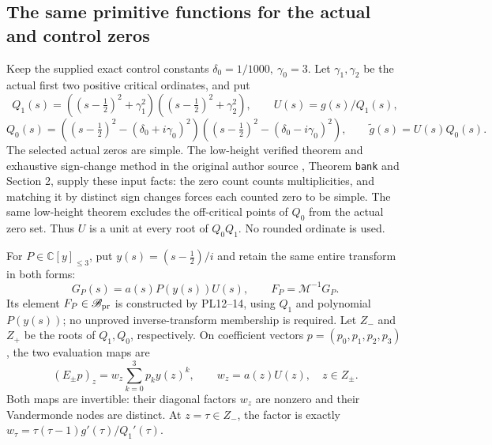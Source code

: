 \documentclass[11pt,a4paper]{article}
\theoremstyle{definition}\newtheorem{definition}[theorem]{Definition}
\newcommand{\C}{\mathbb C}\newcommand{\R}{\mathbb R}
\begin{document}
\subsection{The same primitive functions for the actual and control zeros}
Keep the supplied exact control constants
\(\delta_0=1/1000,\ \gamma_0=3\). Let \(\gamma_1,\gamma_2\)
be the actual first two positive critical ordinates, and put
\[
 Q_1(s)=((s-\tfrac12)^2+\gamma_1^2)
        ((s-\tfrac12)^2+\gamma_2^2),\qquad U(s)=g(s)/Q_1(s),
\]
\[
 Q_0(s)=((s-\tfrac12)^2-(\delta_0+i\gamma_0)^2)
        ((s-\tfrac12)^2-(\delta_0-i\gamma_0)^2),\qquad
 \widetilde g(s)=U(s)Q_0(s).
 \tag{PL29}\label{pl:pl:control}
\]
The selected actual zeros are simple. The low-height verified theorem
and exhaustive sign-change method in the original author source
\cite{PlattTrudgian}, Theorem \texttt{bank} and Section 2, supply these input facts:
the zero count counts multiplicities, and matching it by distinct
sign changes forces each counted zero to be simple. The same
low-height theorem excludes the off-critical points of \(Q_0\)
from the actual zero set. Thus \(U\) is a unit at every root of
\(Q_0Q_1\). No rounded ordinate is used.

For \(P\in\C[y]_{\le3}\), put \(y(s)=(s-\tfrac12)/i\) and retain
the same entire transform in both forms:
\[
 G_P(s)=a(s)P(y(s))U(s),\qquad F_P=\mathcal M^{-1}G_P.
 \tag{PL30}\label{pl:pl:same-tests}
\]
Its element \(F_P\in\mathscr B_{\rm pr}\) is constructed by PL12--14,
using \(Q_1\) and polynomial \(P(y(s))\); no unproved inverse-transform
membership is required.
Let \(Z_-\) and \(Z_+\) be the roots of \(Q_1,Q_0\), respectively.
On coefficient vectors \(p=(p_0,p_1,p_2,p_3)\), the two evaluation maps are
\[
 (E_\pm p)_z=w_z\sum_{k=0}^3p_k y(z)^k,\qquad
 w_z=a(z)U(z),\quad z\in Z_\pm.
 \tag{PL31}\label{pl:pl:Emaps}
\]
Both maps are invertible: their diagonal factors \(w_z\) are nonzero
and their Vandermonde nodes are distinct.
At \(z=\tau\in Z_-\), the factor is exactly
\(w_\tau=\tau(\tau-1)g'(\tau)/Q_1'(\tau)\).
\end{document}
